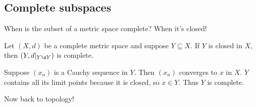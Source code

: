 \documentclass[class=article, crop=false]{standalone}
\begin{document}
\subsection{Complete subspaces}

When is the subset of a metric space complete? When it's closed!
\begin{fact}
    Let $(X,d)$ be a complete metric space and suppose $Y \subseteq X$. If $Y$ is closed in $X$, then $(Y, d|_{Y \x Y})$ is complete.
\end{fact}
\begin{pf}
    Suppose $(x_n)$ is a Cauchy sequence in $Y$. Then $(x_n)$ converges to $x$ in $X$. $Y$ contains all its limit points because it is closed, so $x \in Y$. Thus $Y$ is complete.
\end{pf}

Now back to topology!
\end{document}
